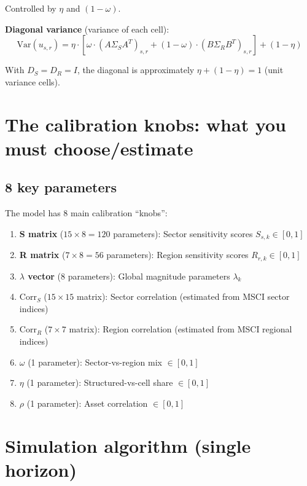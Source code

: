 \documentclass[11pt,a4paper]{article}
\begin{document}
Controlled by $\eta$ and $(1-\omega)$.

\textbf{Diagonal variance} (variance of each cell):
\begin{equation}
\text{Var}(u_{s,r}) = \eta \cdot [\omega \cdot (A \Sigma_S A^T)_{s,r} + (1-\omega) \cdot (B \Sigma_R B^T)_{s,r}] + (1-\eta)
\end{equation}

With $D_S = D_R = I$, the diagonal is approximately $\eta + (1-\eta) = 1$ (unit variance cells).

\section{The calibration knobs: what you must choose/estimate}

\subsection{8 key parameters}

The model has 8 main calibration ``knobs'':

\begin{enumerate}
    \item \textbf{S matrix} ($15 \times 8 = 120$ parameters): Sector sensitivity scores $S_{s,k} \in [0,1]$
    \item \textbf{R matrix} ($7 \times 8 = 56$ parameters): Region sensitivity scores $R_{r,k} \in [0,1]$
    \item \textbf{$\lambda$ vector} (8 parameters): Global magnitude parameters $\lambda_k$
    \item \textbf{$\text{Corr}_S$} ($15 \times 15$ matrix): Sector correlation (estimated from MSCI sector indices)
    \item \textbf{$\text{Corr}_R$} ($7 \times 7$ matrix): Region correlation (estimated from MSCI regional indices)
    \item \textbf{$\omega$} (1 parameter): Sector-vs-region mix $\in [0,1]$
    \item \textbf{$\eta$} (1 parameter): Structured-vs-cell share $\in [0,1]$
    \item \textbf{$\rho$} (1 parameter): Asset correlation $\in [0,1]$
\end{enumerate}

\section{Simulation algorithm (single horizon)}
\end{document}
